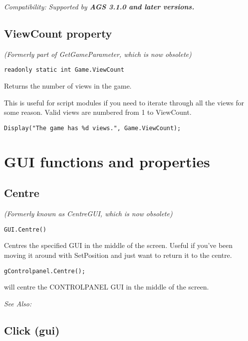 \it{Compatibility:} Supported by \bf{AGS 3.1.0} and later versions.


\subsection{ViewCount property}\label{Game.ViewCount}%

\it{(Formerly part of GetGameParameter, which is now obsolete)}

\begin{verbatim}
readonly static int Game.ViewCount
\end{verbatim}
Returns the number of views in the game.

This is useful for script modules if you need to iterate through all the views for some reason.
Valid views are numbered from 1 to ViewCount.

\begin{verbatim}
Display("The game has %d views.", Game.ViewCount);
\end{verbatim}



\section{GUI functions and properties}\label{GUIFuncsAndProps}%



\subsection{Centre}\label{GUI.Centre}%

\it{(Formerly known as CentreGUI, which is now obsolete)}

\begin{verbatim}
GUI.Centre()
\end{verbatim}
Centres the specified GUI in the middle of the screen. Useful if you've been moving
it around with SetPosition and just want to return it to the centre.

\begin{verbatim}
gControlpanel.Centre();
\end{verbatim}
will centre the CONTROLPANEL GUI in the middle of the screen.

\it{See Also:} 


\subsection{Click (gui)}\label{GUI.Click}%

